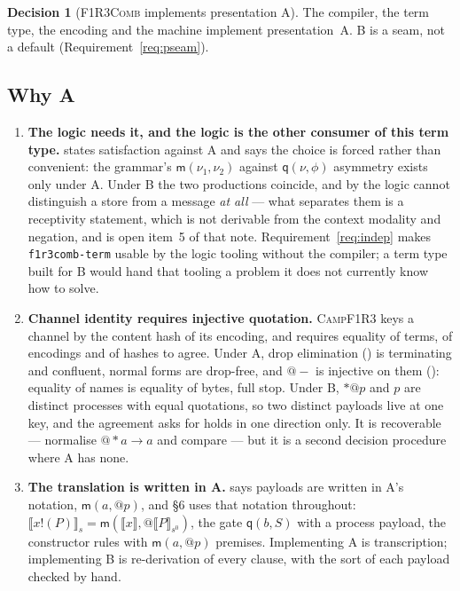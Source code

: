 \documentclass[11pt,a4paper]{article}
\makeatletter
\newcommand{\code}[1]{\texttt{#1}}
\newcommand{\Comb}{\textsc{F1R3Comb}}
\newcommand{\Camp}{\textsc{CampF1R3}}
\newcommand{\quo}[1]{@#1}
\newcommand{\drp}[1]{{*}#1}
\newcommand{\out}[2]{#1!(#2)}
\newcommand{\enc}[1]{\llbracket #1 \rrbracket}
\newcommand{\mm}{\mathsf{m}}
\newcommand{\qq}{\mathsf{q}}
\theoremstyle{definition}
\newtheorem{decision}[definition]{Decision}
\theoremstyle{plain}
\makeatother
\begin{document}
\begin{decision}[\Comb{} implements presentation A]\label{dec:presA}
The compiler, the term type, the encoding and the machine implement
presentation~A. B is a seam, not a default (Requirement~\ref{req:pseam}).
\end{decision}

\subsection{Why A}

\begin{enumerate}[leftmargin=1.8em]

\item \textbf{The logic needs it, and the logic is the other consumer of this
term type.} \cite[Dec.~2.3]{logic} states satisfaction against A and says the
choice is forced rather than convenient: the grammar's $\mm(\nu_1,\nu_2)$
against $\qq(\nu,\phi)$ asymmetry exists only under A. Under B the two
productions coincide, and by \cite[Rem.~2.5]{logic} the logic cannot
distinguish a store from a message \emph{at all} --- what separates them is a
receptivity statement, which is not derivable from the context modality and
negation, and is open item~5 of that note. Requirement~\ref{req:indep} makes
\code{f1r3comb-term} usable by the logic tooling without the compiler; a term
type built for B would hand that tooling a problem it does not currently know
how to solve.

\item \textbf{Channel identity requires injective quotation.} \Camp{} keys a
channel by the content hash of its encoding, and \cite[Req.~2.7]{k1ndl1ng}
requires equality of terms, of encodings and of hashes to agree. Under A,
drop elimination (\cite[Lem.~2.8]{logic}) is terminating and confluent, normal
forms are drop-free, and $\quo{-}$ is injective on them
(\cite[Prop.~2.10]{logic}): equality of names is equality of bytes, full stop.
Under B, $\drp{\quo{p}}$ and $p$ are distinct processes with equal quotations,
so two distinct payloads live at one key, and the agreement
\cite[Req.~2.7]{k1ndl1ng} asks for holds in one direction only. It is
recoverable --- normalise $\quo{\drp{a}} \to a$ and compare --- but it is a
second decision procedure where A has none.

\item \textbf{The translation is written in A.} \cite[Def.~3.3]{draft3} says
payloads are written in A's notation, $\mm(a,\quo{p})$, and \S6 uses that
notation throughout: $\enc{\out{x}{P}}_{s} = \mm(\enc{x},\quo{\enc{P}_{s^0}})$,
the gate $\qq(b,S)$ with a process payload, the constructor rules with
$\mm(a,\quo{p})$ premises. Implementing A is transcription; implementing B is
re-derivation of every clause, with the sort of each payload checked by hand.


\end{enumerate}
\end{document}
